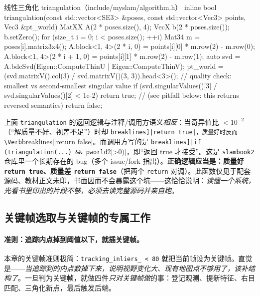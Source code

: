 \begin{codebox}[C++]{线性三角化 triangulation（include/myslam/algorithm.h）}
inline bool triangulation(const std::vector<SE3> &poses,
                          const std::vector<Vec3> points, Vec3 &pt_world) {
    MatXX A(2 * poses.size(), 4);
    VecX b(2 * poses.size());  b.setZero();
    for (size_t i = 0; i < poses.size(); ++i) {
        Mat34 m = poses[i].matrix3x4();
        A.block<1, 4>(2 * i, 0)     = points[i][0] * m.row(2) - m.row(0);
        A.block<1, 4>(2 * i + 1, 0) = points[i][1] * m.row(2) - m.row(1);
    }
    auto svd = A.bdcSvd(Eigen::ComputeThinU | Eigen::ComputeThinV);
    pt_world = (svd.matrixV().col(3) / svd.matrixV()(3, 3)).head<3>();
    // quality check: smallest vs second-smallest singular value
    if (svd.singularValues()[3] / svd.singularValues()[2] < 1e-2)
        return true;        // (see pitfall below: this returns reversed semantics)
    return false;
}
\end{codebox}

\begin{pitfall}
上面 \texttt{triangulation} 的返回逻辑与注释/调用方语义\emph{相反}：当奇异值比 $<10^{-2}$（“解质量不好、视差不足”）时却 \Verb[breaklines]|return true|，质量好时反而 \Verb[breaklines]|return false|。而调用方写的是 \Verb[breaklines]|if (triangulation(...) && pworld[2]>0)|，即“返回 true 才接受”。这是 \texttt{slambook2} 仓库里一个长期存在的 bug（多个 issue/fork 指出）。\textbf{正确逻辑应当是：质量好 \texttt{return true}、质量差 \texttt{return false}}（把两个 \texttt{return} 对调）。此函数仅见于配套源码、教材正文未印，书面因而不会暴露这个坑——这恰恰说明：\emph{读懂一个系统，光看书里印出的片段不够，必须去读完整源码并亲自跑}。
\end{pitfall}

\subsection{关键帧选取与关键帧的专属工作}
\label{sec:sys-keyframe}

\paragraph{准则：追踪内点掉到阈值以下，就插关键帧。}
本章的关键帧准则极简：\texttt{tracking\_inliers\_ < 80} 就把当前帧设为关键帧。直觉是——\emph{当追踪到的内点数掉下来，说明视野变化大、现有地图点不够用了，该补结构了}。一旦判为关键帧，就做四件\emph{只对关键帧做}的事：登记观测、提新特征、右目匹配、三角化新点，最后触发后端。


